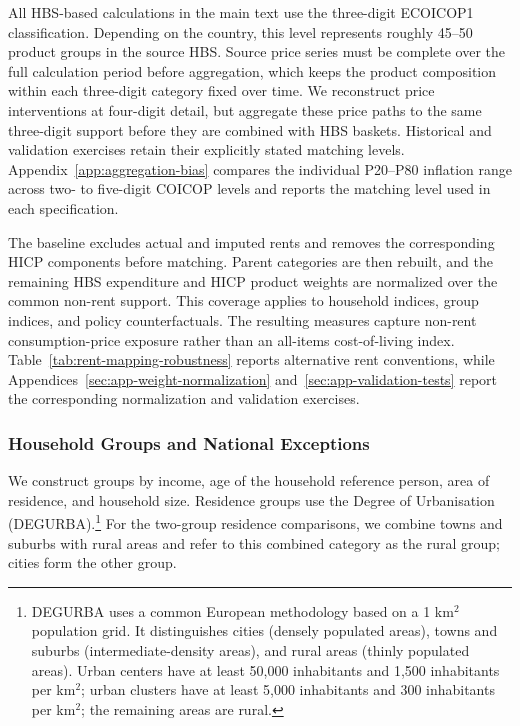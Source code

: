 \documentclass[11pt]{article}
\begin{document}
All HBS-based calculations in the main text use the three-digit ECOICOP1 classification. Depending
on the country, this level represents roughly 45--50 product groups in the source HBS. Source price
series must be complete over the full calculation period before aggregation, which keeps the product
composition within each three-digit category fixed over time. We reconstruct price interventions
at four-digit detail, but aggregate these price paths to the same
three-digit support before they are combined with HBS baskets.
Historical and validation exercises retain their explicitly stated matching levels.
Appendix~\ref{app:aggregation-bias} compares the individual P20--P80 inflation range across two- to
five-digit COICOP levels and reports the matching level used in each specification.

The baseline excludes actual and imputed rents and removes the corresponding HICP components before
matching. Parent categories are then rebuilt, and the remaining HBS expenditure and HICP product
weights are normalized over the common non-rent support. This coverage applies to household indices,
group indices, and policy counterfactuals. The resulting measures capture non-rent consumption-price
exposure rather than an all-items cost-of-living index. Table~\ref{tab:rent-mapping-robustness}
reports alternative rent conventions, while Appendices~\ref{sec:app-weight-normalization}
and~\ref{sec:app-validation-tests} report the corresponding normalization and validation exercises.

\subsubsection*{Household Groups and National Exceptions}

We construct groups by income, age of the household reference person, area of residence, and household size. Residence groups use
the Degree of Urbanisation (DEGURBA).\footnote{DEGURBA uses a common European methodology based on a
1 km$^2$ population grid. It distinguishes cities (densely populated areas), towns and suburbs
(intermediate-density areas), and rural areas (thinly populated areas). Urban centers have at least
50,000 inhabitants and 1,500 inhabitants per km$^2$; urban clusters have at least 5,000 inhabitants
 and 300 inhabitants per km$^2$; the remaining areas are rural.} For the two-group residence
comparisons, we combine towns and suburbs with rural areas and refer to this combined category as the
rural group; cities form the other group.
\end{document}
